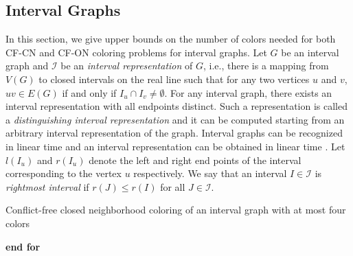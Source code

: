 \documentclass[svgnames]{llncs}
\newcommand{\cfcn}{\textsc {CF-CN}}
\newcommand{\cfon}{\textsc {CF-ON}}
\begin{document}
\subsection{Interval Graphs}
In this section, we give upper bounds on the number of colors needed for both \cfcn{} and \cfon{} coloring problems for interval graphs. 
Let $G$ be an interval graph and $\mathcal{I}$ be an \emph{interval representation} of $G$, i.e., 
there is
a mapping from $V(G)$ to closed intervals on the real line such that for any
two vertices $u$ and $v$, $uv \in E(G)$ if and only if $I_u \cap I_v \neq \emptyset$.
For any interval
graph, there exists an interval representation with all endpoints distinct. Such
a representation is called a \emph{distinguishing interval representation} and it can be computed starting from an
arbitrary interval representation of the graph. 
Interval graphs can be recognized in linear time and an interval representation can be obtained in linear time \cite{booth1976testing}.
 Let $l(I_u)$ and $r(I_u)$ denote the left and right end points of the interval corresponding
to the vertex $u$ respectively. We say that an interval $I \in \mathcal{I}$ is \emph{rightmost interval} if $r(J) \leq r(I)$ for all $J \in \mathcal{I}$.

\begin{algorithm}[t]
\caption{Conflict-free closed neighborhood coloring of an  interval graph with at most four colors}
\label{algo-cfcn}
{\bf end for }

\end{algorithm}
\end{document}
